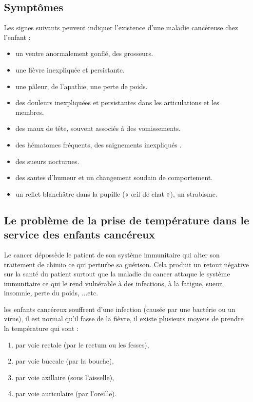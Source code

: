 \documentclass[12pt]{article}
\begin{document}
\newpage

\subsection{Symptômes}
Les signes suivants peuvent indiquer l’existence d’une maladie cancéreuse chez l’enfant \cite{34}:
\begin{itemize}
	\item un ventre anormalement gonflé, des grosseurs.  
	\item une fièvre inexpliquée et persistante. 
	\item une pâleur, de l’apathie, une perte de poids. 
	\item des douleurs inexpliquées et persistantes dans les articulations et les membres.
	\item des maux de tête, souvent associés à des vomissements. 
	\item des hématomes fréquents, des saignements inexpliqués . 
	\item des sueurs nocturnes. 
	\item des sautes d’humeur et un changement soudain de comportement. 
	\item un reflet blanchâtre dans la pupille (« œil de chat »), un strabisme.
\end{itemize}

\subsection{Le problème de la prise de température dans le service des enfants cancéreux}
Le cancer dépossède le patient de son système immunitaire qui alter son traitement de chimio ce qui perturbe sa guérison. Cela produit un retour négative sur la santé du patient surtout que la maladie du cancer attaque le système immunitaire ce qui le rend vulnérable à des infections, à la fatigue, sueur, insomnie, perte du poids, ...etc.

les enfants cancéreux souffrent d’une infection (causée par une bactérie ou un virus), il est normal qu’il fasse de la fièvre, il existe plusieurs moyens de prendre la température qui sont :
\begin{enumerate}
	\item par voie rectale (par le rectum ou les fesses),
	\item par voie buccale (par la bouche),
	\item par voie axillaire (sous l’aisselle),
	\item par voie auriculaire (par l’oreille).
\end{enumerate}
\end{document}
